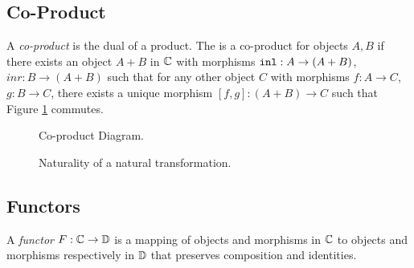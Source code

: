 \subsection{Co-Product}
A \textit{co-product} is the dual of a product. The is a co-product for objects $A, B$ if there exists an object $A+B$ in $\mathbb{C}$ with morphisms $\texttt{inl}: A\rightarrow (A+B)$, $inr: B\rightarrow (A+B)$ such that for any other object $C$ with morphisms $f: A\rightarrow C$, $g: B\rightarrow C$, there exists a unique morphism $[f, g]: (A + B)\rightarrow C $ such that Figure \ref{CoproductDiagram} commutes.

\begin{minipage}{0.47\linewidth}
    \begin{figure}[H]
        \centering
        \begin{framed}
        \end{framed}
        \caption{Co-product Diagram.}
        \label{CoproductDiagram}
    \end{figure}
\end{minipage}\quad
\begin{minipage}{0.47\linewidth}
    \begin{figure}[H]
        \centering
        \begin{framed}
        \end{framed}
        \caption{Naturality of a natural transformation.}
        \label{Naturality}
    \end{figure}
\end{minipage}\quad

\subsection{Functors}
A \textit{functor} $F: \mathbb{C} \rightarrow \mathbb{D}$ is a mapping of objects and morphisms in $\mathbb{C}$ to objects and morphisms respectively in $\mathbb{D}$ that preserves composition and identities.

